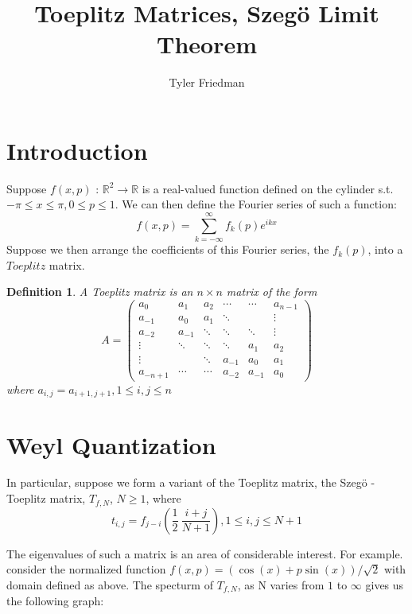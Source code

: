 \documentclass{article}
\title{Toeplitz Matrices, Szeg\"{o} Limit Theorem}
\author{Tyler Friedman}
\newtheorem{mydef}{Definition}[section]
\begin{document}
\maketitle

\section{Introduction}

Suppose $f(x,p)$ :   $\mathbb{R}^{2}  \rightarrow \mathbb{R}$ is a real-valued function defined on the cylinder s.t. $-\pi \le x \le \pi,  0 \le p \le 1$.  We can then define the Fourier series of such a function:
\begin{equation}
f(x,p) = \displaystyle\sum\limits_{k=-\infty}^\infty f_{k}(p)e^{ikx} \label{fourier}
\end{equation}
Suppose we then arrange the coefficients of this Fourier series, the $f_{k}(p)$, into a $Toeplitz$ matrix.

\begin{mydef}
A Toeplitz matrix is an $n\times n$ matrix of the form 
\[
A = 
\begin{pmatrix}
a_{0} & a_{1} & a_{2} & \cdots & \cdots & a_{n-1} \\
a_{-1} & a_{0} & a_{1} & \ddots &  & \vdots \\
a_{-2} & a_{-1} & \ddots & \ddots & \ddots & \vdots \\
\vdots & \ddots & \ddots & \ddots & a_{1} & a_{2} \\
\vdots &  & \ddots & a_{-1} & a_{0} & a_{1} \\
a_{-n+1} & \cdots & \cdots & a_{-2} & a_{-1} & a_{0}
\end{pmatrix}
\]
where $a_{i,j} = a_{i+1,j+1}, 1 \le i,j \le n$
\end{mydef}

\section{Weyl Quantization}
In particular, suppose we form a variant of the Toeplitz matrix, the Szeg\"{o} -Toeplitz matrix, $T_{f,N}$, $N \ge 1$, where
\begin{equation}
t_{i,j} = f_{j-i}(\frac{1}{2}\ \frac{i+j}{N+1}), 1 \le i,j \le N+1 \label{szegomap}
\end{equation}

The eigenvalues of such a matrix is an area of considerable interest.  For example. consider the normalized function $f(x,p) = (\cos(x) + p\sin(x))/\sqrt{2}$ with domain defined as above. The specturm of $T_{f,N}$, as N varies from $1$ to $\infty$ gives us the following graph:
\end{document}
